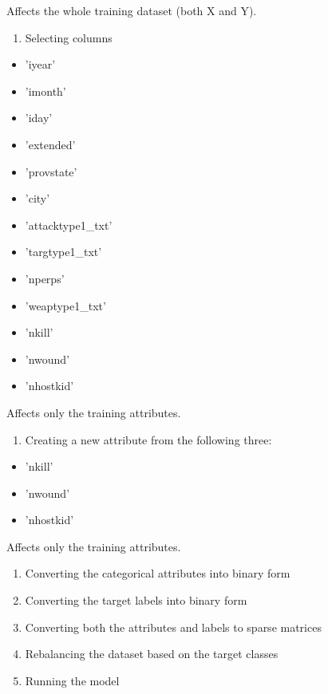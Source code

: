 \documentclass[11pt]{article}
\providecommand{\tightlist}{%
      \setlength{\itemsep}{0pt}\setlength{\parskip}{0pt}}
\begin{document}
Affects the whole training dataset (both X and Y).

\begin{enumerate}
\def\labelenumi{\arabic{enumi}.}
\setcounter{enumi}{1}
\tightlist
\item
  Selecting columns
\end{enumerate}

\begin{itemize}
\tightlist
\item
  'iyear'
\item
  'imonth'
\item
  'iday'
\item
  'extended'
\item
  'provstate'
\item
  'city'
\item
  'attacktype1\_txt'
\item
  'targtype1\_txt'
\item
  'nperps'
\item
  'weaptype1\_txt'
\item
  'nkill'
\item
  'nwound'
\item
  'nhostkid'
\end{itemize}

Affects only the training attributes.

\begin{enumerate}
\def\labelenumi{\arabic{enumi}.}
\setcounter{enumi}{2}
\tightlist
\item
  Creating a new attribute from the following three:
\end{enumerate}

\begin{itemize}
\tightlist
\item
  'nkill'
\item
  'nwound'
\item
  'nhostkid'
\end{itemize}

Affects only the training attributes.

\begin{enumerate}
\def\labelenumi{\arabic{enumi}.}
\setcounter{enumi}{3}
\item
  Converting the categorical attributes into binary form
\item
  Converting the target labels into binary form
\item
  Converting both the attributes and labels to sparse matrices
\item
  Rebalancing the dataset based on the target classes
\item
  Running the model
\end{enumerate}
\end{document}
